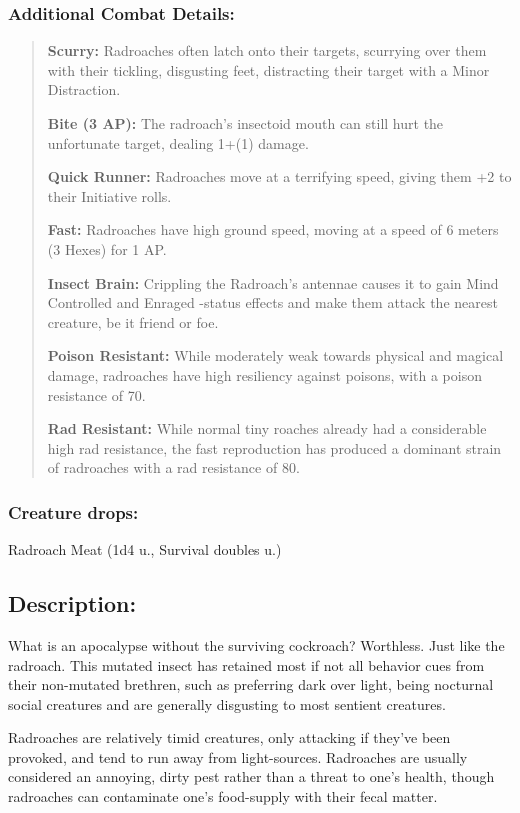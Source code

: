 \documentclass[11pt,a4paper,twocolumn]{book}
\begin{document}
	\subsubsection*{Additional Combat Details:}
	\begin{verse}
		\textbf{Scurry:} Radroaches often latch onto their targets, scurrying over them with their tickling, disgusting feet, distracting their target with a Minor Distraction.
		
		\textbf{Bite (3 AP):} The radroach's insectoid mouth can still hurt the unfortunate target, dealing 1+(1) damage.
		
		\textbf{Quick Runner:} Radroaches move at a terrifying speed, giving them +2 to their Initiative rolls.
		
		\textbf{Fast:} Radroaches have high ground speed, moving at a speed of 6 meters (3 Hexes) for 1 AP.
		
		\textbf{Insect Brain:} Crippling the Radroach's antennae causes it to gain Mind Controlled and Enraged -status effects and make them attack the nearest creature, be it friend or foe.
		
		\textbf{Poison Resistant:} While moderately weak towards physical and magical damage, radroaches have high resiliency against poisons, with a poison resistance of 70.
		
		\textbf{Rad Resistant:} While normal tiny roaches already had a considerable high rad resistance, the fast reproduction has produced a dominant strain of radroaches with a rad resistance of 80.
	\end{verse}
	
	\subsubsection*{Creature drops:}
	Radroach Meat (1d4 u., Survival doubles u.)
	
	
	
	\subsection*{Description:}
	What is an apocalypse without the surviving cockroach? Worthless. Just like the radroach. This mutated insect has retained most if not all behavior cues from their non-mutated brethren, such as preferring dark over light, being nocturnal social creatures and are generally disgusting to most sentient creatures.
	
	Radroaches are relatively timid creatures, only attacking if they've been provoked, and tend to run away from light-sources. Radroaches are usually considered an annoying, dirty pest rather than a threat to one's health, though radroaches can contaminate one's food-supply with their fecal matter.
	
\end{document}
